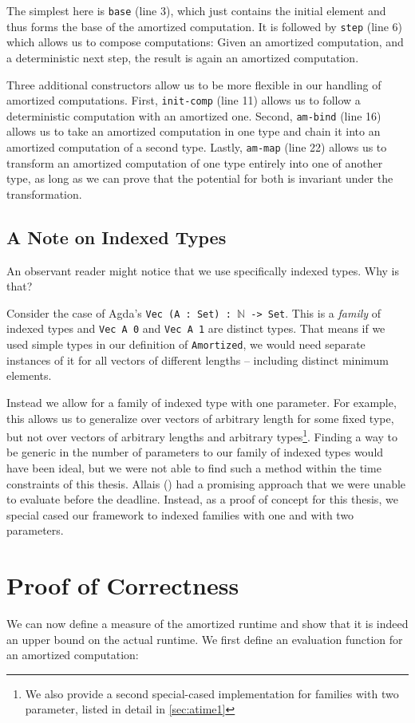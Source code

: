 The simplest here is \texttt{base} (line 3), which just contains the initial element and thus forms the base of the amortized computation. It is followed by \texttt{step} (line 6) which allows us to compose computations: Given an amortized computation, and a deterministic next step, the result is again an amortized computation.

Three additional constructors allow us to be more flexible in our handling of amortized computations. First, \texttt{init-comp} (line 11) allows us to follow a deterministic computation with an amortized one. Second, \texttt{am-bind} (line 16) allows us to take an amortized computation in one type and chain it into an amortized computation of a second type. Lastly, \texttt{am-map} (line 22) allows us to transform an amortized computation of one type entirely into one of another type, as long as we can prove that the potential for both is invariant under the transformation.

\subsection{A Note on Indexed Types}
An observant reader might notice that we use specifically indexed types. Why is that?

Consider the case of Agda's \texttt{Vec (A : Set) : $\mathbb N$ -> Set}. This is a \emph{family} of indexed types and \texttt{Vec A 0} and \texttt{Vec A 1} are distinct types. That means if we used simple types in our definition of \texttt{Amortized}, we would need separate instances of it for all vectors of different lengths -- including distinct minimum elements.

Instead we allow for a family of indexed type with one parameter. For example, this allows us to generalize over vectors of arbitrary length for some fixed type, but not over vectors of arbitrary lengths and arbitrary types\footnote{We also provide a second special-cased implementation for families with two parameter, listed in detail in \autoref{sec:atime1}}. Finding a way to be generic in the number of parameters to our family of indexed types would have been ideal, but we were not able to find such a method within the time constraints of this thesis. Allais (\cite{allais:2019:polymorphic-nary-functions}) had a promising approach that we were unable to evaluate before the deadline. Instead, as a proof of concept for this thesis, we special cased our framework to indexed families with one and with two parameters.

\section{Proof of Correctness}
We can now define a measure of the amortized runtime and show that it is indeed an upper bound on the actual runtime. We first define an evaluation function for an amortized computation:

